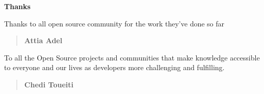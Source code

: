 
\begin{center}
\textbf{Thanks}\\
\bigskip
\bigskip
\bigskip
\end{center}

{
  \Thanks
  Thanks to all open source community for the work they've done so far
}

\begin{quote}
\begin{flushright}
\selectfont
\textbf{Attia Adel}
\end{flushright}
\end{quote}

\medskip

{
  \Thanks
  To all the Open Source projects and communities that make knowledge
  accessible to everyone and our lives as developers more challenging and
  fulfilling.
}

\begin{quote}
\begin{flushright}
\selectfont
\textbf{Chedi Toueiti}
\end{flushright}
\end{quote}